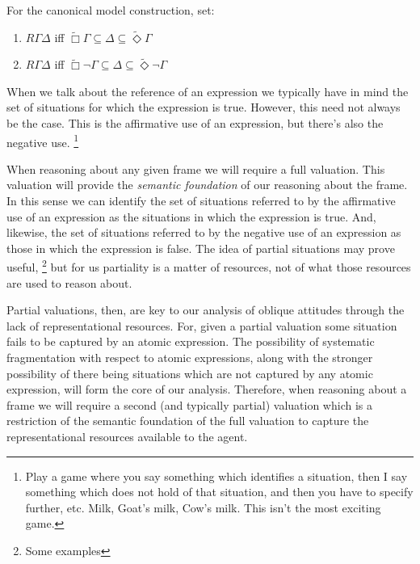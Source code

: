\documentclass[10pt]{article}
\begin{document}
For the canonical model construction, set:
\begin{enumerate}
\item \(R\Gamma\Delta\) iff \(\widetilde{\Box}\Gamma \subseteq \Delta \subseteq \widetilde{\Diamond}\Gamma\)
\item \(R\Gamma\Delta\) iff \(\widetilde{\Box}\lnot\Gamma \subseteq \Delta \subseteq \widetilde{\Diamond}\lnot\Gamma\)
\end{enumerate}

\newpage

\hfill
\printbibliography

\newpage

When we talk about the reference of an expression we typically have in mind the set of situations for which the expression is true.
However, this need not always be the case.
This is the affirmative use of an expression, but there's also the negative use.\nolinebreak
\footnote{Play a game where you say something which identifies a situation, then I say something which does not hold of that situation, and then you have to specify further, etc.
  Milk, Goat's milk, Cow's milk.
  This isn't the most exciting game.}


When reasoning about any given frame we will require a full valuation.
This valuation will provide the \emph{semantic foundation} of our reasoning about the frame.
In this sense we can identify the set of situations referred to by the affirmative use of an expression as the situations in which the expression is true.
And, likewise, the set of situations referred to by the negative use of an expression as those in which the expression is false.
The idea of partial situations may prove useful,\nolinebreak
\footnote{Some examples}
but for us partiality is a matter of resources, not of what those resources are used to reason about.

Partial valuations, then, are key to our analysis of oblique attitudes through the lack of representational resources.
For, given a partial valuation some situation fails to be captured by an atomic expression.
The possibility of systematic fragmentation with respect to atomic expressions, along with the stronger possibility of there being situations which are not captured by any atomic expression, will form the core of our analysis.
Therefore, when reasoning about a frame we will require a second (and typically partial) valuation which is a restriction of the semantic foundation of the full valuation to capture the representational resources available to the agent.
\end{document}
